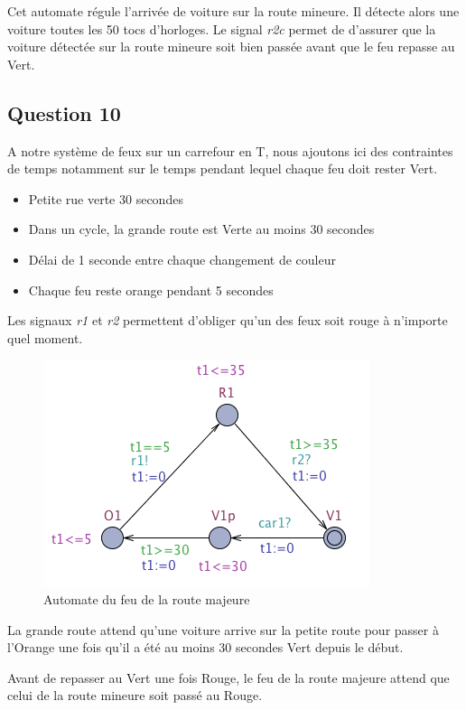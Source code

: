 \documentclass[11pt]{article}
\begin{document}
Cet automate régule l'arrivée de voiture sur la route mineure. Il détecte alors une voiture toutes les 50 tocs d'horloges. Le signal \emph{r2c} permet de d'assurer que la voiture détectée sur la route mineure soit bien passée avant que le feu repasse au Vert.

\subsection{Question 10}

A notre système de feux sur un carrefour en T, nous ajoutons ici des contraintes de temps notamment sur le temps pendant lequel chaque feu doit rester Vert.

\begin{itemize}
	\item Petite rue verte 30 secondes
	\item Dans un cycle, la grande route est Verte au moins 30 secondes
	\item Délai de 1 seconde entre chaque changement de couleur
	\item Chaque feu reste orange pendant 5 secondes
\end{itemize}

Les signaux \emph{r1} et \emph{r2} permettent d'obliger qu'un des feux soit rouge à n'importe quel moment.

\begin{figure}[H]
	\centering
	\includegraphics{ressources/part3/Q10-1.png}
	\caption{Automate du feu de la route majeure}
\end{figure}

La grande route attend qu'une voiture arrive sur la petite route pour passer à l'Orange une fois qu'il a été au moins 30 secondes Vert depuis le début.

Avant de repasser au Vert une fois Rouge, le feu de la route majeure attend que celui de la route mineure soit passé au Rouge.
\end{document}

